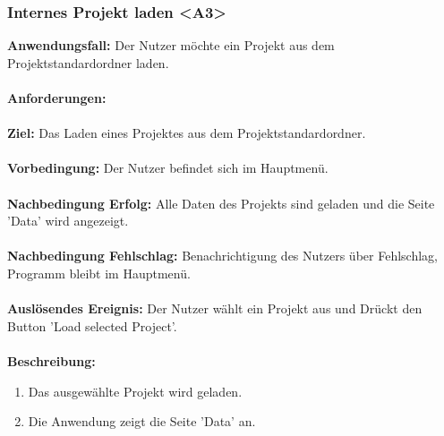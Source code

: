 \documentclass[parskip=full]{scrartcl} %
\begin{document}
\subsubsection*{Internes Projekt laden <A3>}
\textbf{Anwendungsfall:} Der Nutzer möchte ein Projekt aus dem Projektstandardordner laden.\\\\
\textbf{Anforderungen:} \\\\
\textbf{Ziel:} Das Laden eines Projektes aus dem Projektstandardordner. \\\\
\textbf{Vorbedingung:} Der Nutzer befindet sich im Hauptmenü.  \\\\
\textbf{Nachbedingung Erfolg:} Alle Daten des Projekts sind geladen und die Seite 'Data' wird angezeigt. \\\\
\textbf{Nachbedingung Fehlschlag:} Benachrichtigung des Nutzers über Fehlschlag, Programm  bleibt im Hauptmenü. \\\\
\textbf{Auslösendes Ereignis:}  Der Nutzer wählt ein Projekt aus und Drückt den Button 'Load selected Project'. \\\\
\textbf{Beschreibung:}
\begin{enumerate}
    \item Das ausgewählte Projekt wird geladen.
    \item Die Anwendung zeigt die Seite 'Data' an.
\end{enumerate}
\newpage
\end{document}
